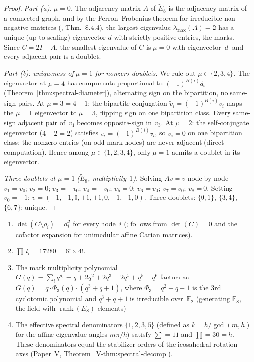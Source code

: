 \begin{proof}
\emph{Part (a): $\mu = 0$.}
The adjacency matrix $A$ of $\tilde{E}_8$ is the
adjacency matrix of a connected graph, and by the
Perron--Frobenius theorem for irreducible non-negative
matrices (\citealt{HornJohnson2013}, Thm.~8.4.4), the
largest eigenvalue $\lambda_{\max}(A) = 2$ has a unique
(up to scaling) eigenvector $d$ with strictly positive
entries, the marks.  Since $C = 2I - A$, the smallest
eigenvalue of $C$ is $\mu = 0$ with eigenvector~$d$,
and every adjacent pair is a doublet.

\emph{Part (b): uniqueness of $\mu = 1$ for nonzero
doublets.} We rule out $\mu \in \{2, 3, 4\}$.
The eigenvector at $\mu = 4$ has components proportional to
$(-1)^{B(i)} d_i$ (Theorem~\ref{thm:spectral-diameter}),
alternating sign on the bipartition, no same-sign pairs.
At $\mu = 3 = 4 - 1$: the bipartite conjugation
$\tilde v_i = (-1)^{B(i)} v_i$ maps the $\mu = 1$ eigenvector
to $\mu = 3$, flipping sign on one bipartition class.
Every same-sign adjacent pair of~$v_1$ becomes opposite-sign
in~$v_3$.
At $\mu = 2$: the self-conjugate eigenvector ($4-2=2$)
satisfies $v_i = (-1)^{B(i)} v_i$, so $v_i = 0$ on one
bipartition class; the nonzero entries (on odd-mark nodes)
are never adjacent (direct computation).
Hence among $\mu \in \{1, 2, 3, 4\}$, only $\mu = 1$ admits
a doublet in its eigenvector.

\emph{Three doublets at $\mu = 1$ ($\tilde{E}_8$,
multiplicity~$1$).}
Solving $Av = v$ node by node:
$v_1 = v_0$; $v_2 = 0$; $v_3 = -v_0$; $v_4 = -v_0$; $v_5 = 0$;
$v_6 = v_0$; $v_7 = v_0$; $v_8 = 0$.
Setting $v_0 = -1$: $v = (-1,-1,0,+1,+1,0,-1,-1,0)$.
Three doublets: $\{0,1\}$, $\{3,4\}$, $\{6,7\}$; unique.
\end{proof}

\begin{proposition}\label{prop:supporting}
\leavevmode
\begin{enumerate}
\item $\det(C \setminus \rho_i) = d_i^2$ for every node~$i$
  (\citealt[Ch.~4]{Kac1990}; follows from $\det(C) = 0$ and
  the cofactor expansion for unimodular affine Cartan matrices).
\item $\prod d_i = 17280 = 6! \times 4!$.
\item The mark multiplicity polynomial
  $G(q) = \sum_i q^{d_i} = q + 2q^2 + 2q^3 + 2q^4 + q^5 + q^6$
  factors as $G(q) = q \cdot \Phi_3(q) \cdot (q^3+q+1)$,
  where $\Phi_3 = q^2{+}q{+}1$ is the $3$rd cyclotomic polynomial
  and $q^3{+}q{+}1$ is irreducible over~$\mathbb{F}_2$
  (generating $\mathbb{F}_8$, the field with $\operatorname{rank}(E_8)$
  elements).
\item The effective spectral denominators $\{1,2,3,5\}$ (defined
  as $k = h/\gcd(m,h)$ for the affine eigenvalue angles $m\pi/h$)
  satisfy $\sum = 11$ and $\prod = 30 = h$.
  These denominators equal the stabilizer orders of the icosahedral
  rotation axes (Paper~V, Theorem~\ref{V-thm:spectral-decomp}).
\end{enumerate}
\end{proposition}

